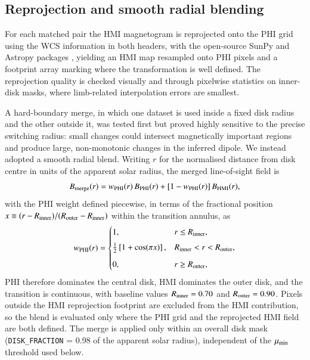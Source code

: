 \documentclass{aa}
\begin{document}
\subsection{Reprojection and smooth radial blending}
\label{sec:methods-merge}

For each matched pair the HMI magnetogram is reprojected onto the PHI grid using the WCS information in both headers, with the open-source SunPy and Astropy packages \citep{SunPy2020,Astropy2018}, yielding an HMI map resampled onto PHI pixels and a footprint array marking where the transformation is well defined. The reprojection quality is checked visually and through pixelwise statistics on inner-disk masks, where limb-related interpolation errors are smallest.

A hard-boundary merge, in which one dataset is used inside a fixed disk radius and the other outside it, was tested first but proved highly sensitive to the precise switching radius: small changes could intersect magnetically important regions and produce large, non-monotonic changes in the inferred dipole. We instead adopted a smooth radial blend. Writing $r$ for the normalised distance from disk centre in units of the apparent solar radius, the merged line-of-sight field is
\begin{equation}
    B_{\rm merge}(r) = w_{\rm PHI}(r)\, B_{\rm PHI}(r) + \left[1 - w_{\rm PHI}(r)\right] B_{\rm HMI}(r),
    \label{eq:blend}
\end{equation}
with the PHI weight defined piecewise, in terms of the fractional position $x \equiv (r - R_{\rm inner})/(R_{\rm outer} - R_{\rm inner})$ within the transition annulus, as
\begin{equation}
    w_{\rm PHI}(r) =
    \begin{cases}
        1, & r \le R_{\rm inner}, \\[4pt]
        \frac{1}{2}\left[1 + \cos(\pi x)\right], & R_{\rm inner} < r < R_{\rm outer}, \\[6pt]
        0, & r \ge R_{\rm outer},
    \end{cases}
    \label{eq:weight}
\end{equation}
PHI therefore dominates the central disk, HMI dominates the outer disk, and the transition is continuous, with baseline values $R_{\rm inner} = 0.70$ and $R_{\rm outer} = 0.90$. Pixels outside the HMI reprojection footprint are excluded from the HMI contribution, so the blend is evaluated only where the PHI grid and the reprojected HMI field are both defined. The merge is applied only within an overall disk mask (\texttt{DISK\_FRACTION} = 0.98 of the apparent solar radius), independent of the $\mu_{\rm min}$ threshold used below.
\end{document}
